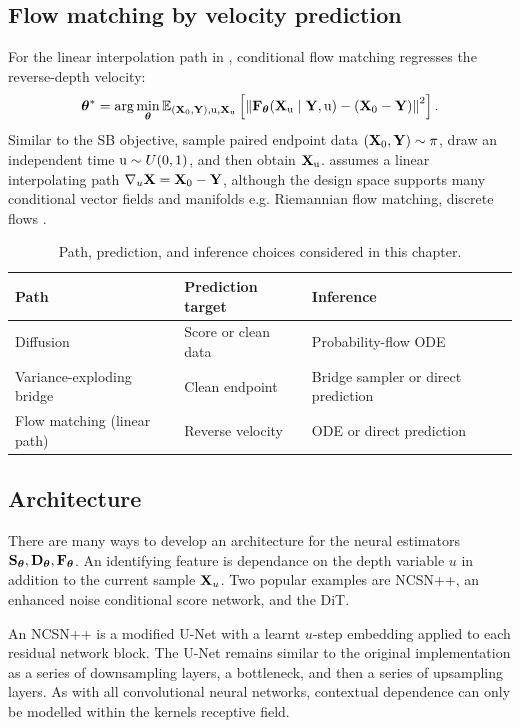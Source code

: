\subsection{Flow matching by velocity prediction}
\label{sec:flow-matching-objective}
For the linear interpolation path in , conditional flow matching regresses the reverse-depth velocity:
\[
\label{eq:flow-matching-objective}
{\bm{\theta}}^\ast =\arg\min_{\bm{\theta}}\mathbb E_{({\mathbf{X}}_0,{\mathbf{Y}}),{\textnormal{u}},{\mathbf{X}}_{\textnormal{u}}}\left[\left\|{\mathbf{F}}_{\bm{\theta}}({\mathbf{X}}_{\textnormal{u}}\mid{\mathbf{Y}},{\textnormal{u}})-({\mathbf{X}}_0 -{\mathbf{Y}})\right\|^2\right].
\]
Similar to the \ac{SB} objective, sample paired endpoint data $({\mathbf{X}}_0,{\mathbf{Y}})\sim\pi$, draw an independent time ${\textnormal{u}}\sim U(0,1)$, and then obtain ${\mathbf{X}}_{\textnormal{u}}$.  assumes a linear interpolating path $\nabla_u {\mathbf{X}}={\mathbf{X}}_0-{\mathbf{Y}}$, although the design space supports many conditional vector fields and manifolds e.g. Riemannian flow matching, discrete flows \citep{chenFlowMatchingGeneral2024, gat2024discrete, lipman2024flowmatchingguide}.

\begin{table}[tb]
\centering\small
\begin{tabular}{lll}
\toprule
Path & Prediction target & Inference \\
\midrule
Diffusion & Score or clean data & Probability-flow \ac{ODE} \\
Variance-exploding bridge & Clean endpoint & Bridge sampler or direct prediction \\
Flow matching (linear path) & Reverse velocity & \ac{ODE} or direct prediction \\
\bottomrule
\end{tabular}
\caption{Path, prediction, and inference choices considered in this chapter.}
\end{table}

\subsection{Architecture}
There are many ways to develop an architecture for the neural estimators ${\mathbf{S}}_{\bm{\theta}},{\mathbf{D}}_{\bm{\theta}},{\mathbf{F}}_{\bm{\theta}}$. An identifying feature is dependance on the depth variable $u$ in addition to the current sample ${\mathbf{X}}_u$. Two popular examples are NCSN++, an enhanced noise conditional score network, and the \ac{DiT}.

An NCSN++ \citep{song2021sde} is a modified U-Net \citep{ronneberger2015unet} with a learnt $u$-step embedding applied to each residual network block. The U-Net remains similar to the original implementation as a series of downsampling layers, a bottleneck, and then a series of upsampling layers. As with all convolutional neural networks, contextual dependence can only be modelled within the kernels receptive field.

